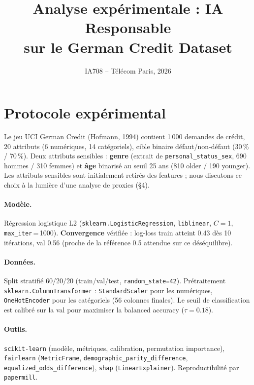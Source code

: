 \documentclass[11pt, a4paper]{article}
\title{\vspace{-1.5em}\textbf{Analyse exp\'erimentale : IA Responsable\\sur le German Credit Dataset}}
\author{IA708 -- T\'el\'ecom Paris, 2026}
\date{}
\begin{document}
\maketitle
\vspace{-2em}

\section{Protocole exp\'erimental}

Le jeu UCI German Credit (Hofmann, 1994) contient 1\,000 demandes de cr\'edit, 20 attributs (6 num\'eriques, 14 cat\'egoriels), cible binaire d\'efaut/non-d\'efaut (30\,\% / 70\,\%). Deux attributs sensibles : \textbf{genre} (extrait de \texttt{personal\_status\_sex}, 690 hommes / 310 femmes) et \textbf{\^age} binaris\'e au seuil 25 ans (810 older / 190 younger). Les attributs sensibles sont initialement retir\'es des features ; nous discutons ce choix \`a la lumi\`ere d'une analyse de proxies (\S 4).

\paragraph{Mod\`ele.} R\'egression logistique L2 (\texttt{sklearn.LogisticRegression}, \texttt{liblinear}, $C=1$, \texttt{max\_iter}\,=\,1000). \textbf{Convergence} v\'erifi\'ee : log-loss train atteint 0.43 d\`es 10 it\'erations, val 0.56 (proche de la r\'ef\'erence 0.5 attendue sur ce d\'es\'equilibre).

\paragraph{Donn\'ees.} Split stratifi\'e 60/20/20 (train/val/test, \texttt{random\_state=42}). Pr\'etraitement \texttt{sklearn.ColumnTransformer} : \texttt{StandardScaler} pour les num\'eriques, \texttt{OneHotEncoder} pour les cat\'egoriels (56 colonnes finales). Le seuil de classification est calibr\'e sur la val pour maximiser la balanced accuracy ($\tau = 0.18$).

\paragraph{Outils.} \texttt{scikit-learn} (mod\`ele, m\'etriques, calibration, permutation importance), \texttt{fairlearn} (\texttt{MetricFrame}, \texttt{demographic\_parity\_difference}, \texttt{equalized\_odds\_difference}), \texttt{shap} (\texttt{LinearExplainer}). Reproductibilit\'e par \texttt{papermill}.
\end{document}
